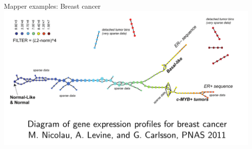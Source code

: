 \documentclass[usenames,dvipsnames,aspectratio=1610]{beamer}
\begin{document}
 \begin{frame}{Mapper examples: Breast cancer}
   \centering
   \includegraphics[scale=0.4]{images/mapper_cancer.png}
 \end{frame}
\end{document}
